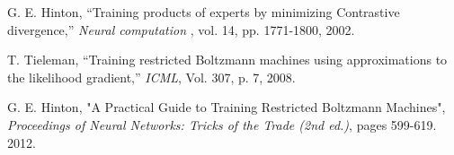 \begin{thebibliography}{9}

G. E. Hinton, “Training products of experts by minimizing Contrastive divergence,”
\textit{Neural computation}
, vol. 14, pp. 1771-1800, 2002.

T. Tieleman, “Training restricted Boltzmann machines using approximations to the likelihood gradient,”
\textit{ICML}, Vol. 307, p. 7, 2008.

G. E. Hinton, "A Practical Guide to Training Restricted Boltzmann Machines", \textit{Proceedings of Neural Networks: Tricks of the Trade (2nd ed.)}, pages 599-619. 2012. 

\end{thebibliography}
